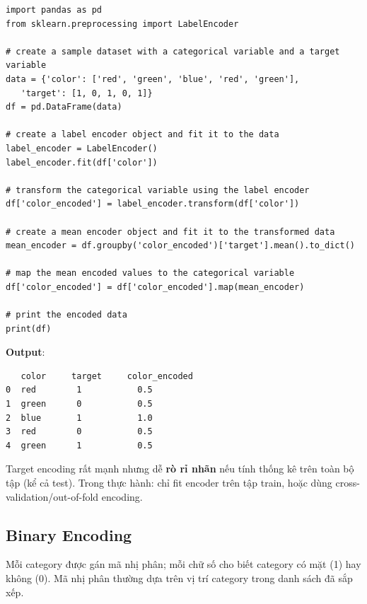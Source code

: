 \begin{vidu}[title={Ví dụ Target Encoding (label encoder + mean theo nhóm)}]
\begin{lstlisting}
import pandas as pd
from sklearn.preprocessing import LabelEncoder

# create a sample dataset with a categorical variable and a target variable
data = {'color': ['red', 'green', 'blue', 'red', 'green'],
   'target': [1, 0, 1, 0, 1]}
df = pd.DataFrame(data)

# create a label encoder object and fit it to the data
label_encoder = LabelEncoder()
label_encoder.fit(df['color'])

# transform the categorical variable using the label encoder
df['color_encoded'] = label_encoder.transform(df['color'])

# create a mean encoder object and fit it to the transformed data
mean_encoder = df.groupby('color_encoded')['target'].mean().to_dict()

# map the mean encoded values to the categorical variable
df['color_encoded'] = df['color_encoded'].map(mean_encoder)

# print the encoded data
print(df)
\end{lstlisting}

\textbf{Output}:
\begin{lstlisting}
   color     target     color_encoded
0  red        1           0.5
1  green      0           0.5
2  blue       1           1.0
3  red        0           0.5
4  green      1           0.5
\end{lstlisting}
\end{vidu}

\begin{luuy}[title={Lưu ý: data leakage}]
Target encoding rất mạnh nhưng dễ \textbf{rò rỉ nhãn} nếu tính thống kê trên toàn bộ tập (kể cả test). Trong thực hành: chỉ fit encoder trên tập train, hoặc dùng cross-validation/out-of-fold encoding.
\end{luuy}

\subsection{Binary Encoding}

\begin{dinhnghia}[title={Binary encoding}]
Mỗi category được gán mã nhị phân; mỗi chữ số cho biết category có mặt (1) hay không (0).
Mã nhị phân thường dựa trên vị trí category trong danh sách đã sắp xếp.
\end{dinhnghia}

